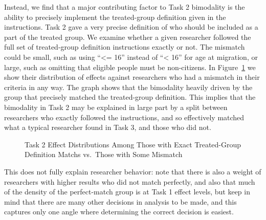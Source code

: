 \documentclass[
  letterpaper,
  DIV=11,
  numbers=noendperiod]{scrartcl}
\begin{document}
Instead, we find that a major contributing factor to Task 2 bimodality
is the ability to precisely implement the treated-group definition given
in the instructions. Task 2 gave a very precise definition of who should
be included as a part of the treated group. We examine whether a given
researcher followed the full set of treated-group definition
instructions exactly or not. The mismatch could be small, such as using
``\textless= 16'' instead of ``\textless{} 16'' for age at migration, or
large, such as omitting that eligible people must be non-citizens. In
Figure~\ref{fig-match-vs-mismatch} we show their distribution of effects
against researchers who had a mismatch in their criteria in any way. The
graph shows that the bimodality heavily driven by the group that
precisely matched the treated-group definition. This implies that the
bimodality in Task 2 may be explained in large part by a split between
researchers who exactly followed the instructions, and so effectively
matched what a typical researcher found in Task 3, and those who did
not.

\begin{figure}


\caption{\label{fig-match-vs-mismatch}Task 2 Effect Distributions Among
Those with Exact Treated-Group Definition Matchs vs.~Those with Some
Mismatch}

\end{figure}%

This does not fully explain researcher behavior: note that there is also
a weight of researchers with higher results who did not match perfectly,
and also that much of the density of the perfect-match group is at Task
1 effect levels, but keep in mind that there are many other decisions in
analysis to be made, and this captures only one angle where determining
the correct decision is easiest.
\end{document}
